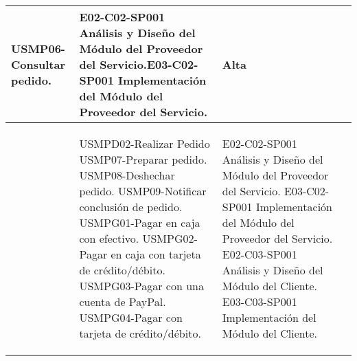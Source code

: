 \begin{center}
\begin{longtable}{|p{}|p{}|p{}|p{}|}
\begin{Titemize}
												\Titem USMP06-Consultar pedido.
											 \end{Titemize} & \Titem E02-C02-SP001 Análisis y Diseño del Módulo del Proveedor del Servicio.\Titem E03-C02-SP001 Implementación del Módulo del Proveedor del Servicio. & Alta\\
\hline
	\getElementById[Requerimiento]{REQMP08}& \begin{Titemize}
												\Titem USMPD02-Realizar Pedido
												\Titem USMP07-Preparar pedido.
												\Titem USMP08-Deshechar pedido.
												\Titem USMP09-Notificar conclusión de pedido.
												\Titem USMPG01-Pagar en caja con efectivo.
												\Titem USMPG02-Pagar en caja con tarjeta de crédito/débito.
												\Titem USMPG03-Pagar con una cuenta de PayPal.
												\Titem USMPG04-Pagar con tarjeta de crédito/débito.
											 \end{Titemize} & 
											 \Titem E02-C02-SP001 Análisis y Diseño del Módulo del Proveedor del Servicio.
											 \Titem E03-C02-SP001 Implementación del Módulo del Proveedor del Servicio.
											 \Titem E02-C03-SP001 Análisis y Diseño del Módulo del Cliente.
											 \Titem E03-C03-SP001 Implementación del Módulo del Cliente.
											 

\end{longtable}
\end{center}
